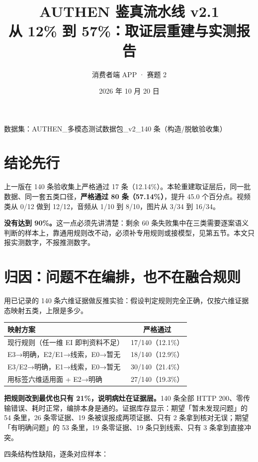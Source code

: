 \documentclass[11pt]{ctexart}
\title{\textbf{AUTHEN 鉴真流水线 v2.1\\从 12\% 到 57\%：取证层重建与实测报告}}
\author{消费者端 APP · 赛题 2}
\date{2026 年 10 月 20 日}
\begin{document}
\maketitle
\vspace{-1.2em}
\begin{center}\small 数据集：AUTHEN\_多模态测试数据包\_v2\_140 条（构造/脱敏验收集）\end{center}

\section{结论先行}

上一版在 140 条验收集上严格通过 17 条（12.14\%）。本轮重建取证层后，同一批数据、同一套五类口径，\textbf{严格通过 80 条（57.14\%）}，提升 45.0 个百分点。视频类从 0/12 做到 12/12，音频从 1/10 到 8/10，图片从 3/34 到 16/34。

\textbf{没有达到 90\%。}这一点必须先讲清楚：剩余 60 条失败集中在三类需要逐案语义判断的样本上，靠通用规则改不动，必须补专用规则或接模型，见第五节。本文只报实测数字，不报推测数字。

\section{归因：问题不在编排，也不在融合规则}

用已记录的 140 条六维证据做反推实验：假设判定规则完全正确，仅按六维证据态映射五类，上限是多少。

\begin{center}\small
\begin{tabular}{lc}
\toprule
映射方案 & 严格通过 \\
\midrule
现行规则（任一维 EI 即判资料不足） & 17/140（12.1\%）\\
E3→明确，E2/E1→线索，E0→暂无 & 18/140（12.9\%）\\
E3/E2→明确，E1→线索，E0→暂无 & 30/140（21.4\%）\\
用标签六维适用面 + E2→明确 & 27/140（19.3\%）\\
\bottomrule
\end{tabular}
\end{center}

\textbf{把规则改到最优也只有 21\%，说明病灶在证据层。}140 条全部 HTTP 200、零传输错误、耗时正常，编排本身是通的。证据库存显示：期望「暂未发现问题」的 54 条里，26 条零证据、19 条被误报成两项证据、只有 2 条拿到核对无误；期望「有明确问题」的 53 条里，19 条零证据、19 条只到线索、只有 3 条拿到直接冲突。

四条结构性缺陷，逐条对应样本：
\end{document}
